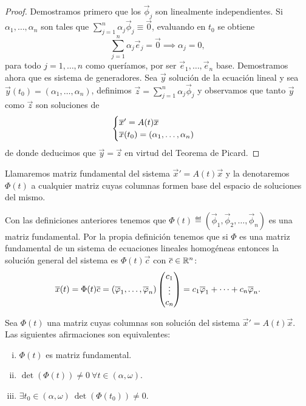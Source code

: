 \documentclass[../ecuaciones_diferenciales.tex]{subfiles}
\begin{document}
\begin{proof}
	Demostramos primero que los \(\vec{\phi}_j\) son linealmente independientes.
	Si \(\alpha_1, \dots, \alpha_n\) son tales que
	\(\sum_{j = 1}^n \alpha_j \vec{\phi}_j \equiv \vec{0}\),
	evaluando en \(t_0\) se obtiene
	\[\sum_{j = 1}^n \alpha_j \vec{e}_j = \vec{0} \implies \alpha_j = 0,\]
	para todo \(j = 1, \dots, n\) como queríamos, por ser
	\(\vec{e}_1, \dots, \vec{e}_n\) base.
	Demostramos ahora que es sistema de generadores. Sea \(\vec{y}\) solución
	de la ecuación lineal y sea
	\(\vec{y}(t_0) = (\alpha_1, \dots, \alpha_n)\),
	definimos \(\vec{z} = \sum_{j = 1}^n \alpha_j \vec{\phi}_j\) y observamos
	que tanto \(\vec{y}\) como \(\vec{z}\) son soluciones de
	\[\begin{cases}
		\overline{x}' = A(t)\overline{x} \\
		\overline{x}(t_0) = (\alpha_1, \dots, \alpha_n)\end{cases}\]
	de donde deducimos que \(\vec{y} = \vec{z}\) en virtud del
	Teorema de Picard.
\end{proof}

\begin{definition}
	Llamaremos matriz fundamental del sistema
	\(\vec{x}' = A(t)\vec{x}\) y la denotaremos
	\(\Phi(t)\) a cualquier matriz cuyas columnas formen base del espacio de
	soluciones del mismo.
\end{definition}

Con las definiciones anteriores tenemos que
\(\Phi(t) \eqdef (\vec{\phi}_1, \vec{\phi}_2, \dots, \vec{\phi}_n)\) es una matriz
fundamental. Por la propia definición tenemos que si \(\Phi\) es una matriz
fundamental de un sistema de ecuaciones lineales homogéneas entonces la solución
general del sistema es \(\Phi(t)\vec{c}\) con \(\overline{c} \in \mathbb{R}^n\):
\[\overline{x}(t) = \Phi(t) \overline{c}
	= (\overline{\varphi}_1, \dots, \overline{\varphi}_n) \begin{pmatrix}c_1 \\ \vdots \\ c_n\end{pmatrix} =
	c_1\overline{\varphi}_1 + \cdots + c_n\overline{\varphi}_n.\]

\begin{proposition}
	Sea \(\Phi(t)\) una matriz cuyas columnas son solución del sistema
	\(\vec{x}' = A(t)\vec{x}\). Las siguientes afirmaciones son equivalentes:
	\begin{multicols}{2}
	\begin{enumerate}[i)]
		\item \(\Phi(t)\) es matriz fundamental.

		\item \(\det(\Phi(t)) \neq 0 \ \forall t \in (\alpha, \omega)\).

		\item \(\exists t_0 \in (\alpha, \omega) \ \det(\Phi(t_0)) \neq 0\).
	\end{enumerate}
	\end{multicols}
\end{proposition}
\end{document}
